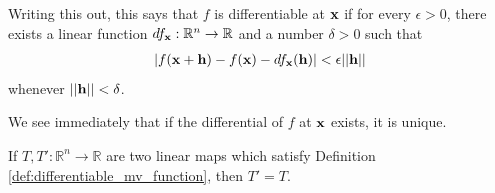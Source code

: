 \documentclass[12pt,letterpaper,reqno]{article}
\numberwithin{equation}{section}
\newcommand{\bh}{{\bf h}}
\newcommand{\R}{\ensuremath{\mathbb R}}
\newcommand{\bx}{{\bf x}}
\begin{document}
{\begin{defn}
Writing this out, this says that $f$ is differentiable at $\bx$ if for every $\epsilon>0$, there exists a linear function $df_\bx:\R^n \to \R$ and a number $\delta>0$ such that 
\begin{align*}
	|f(\bx+\bh)-f(\bx)-df_\bx(\bh)|<\epsilon ||\bh||
\end{align*}
whenever $||\bh||<\delta$.
\end{defn}
We see immediately that if the differential of $f$ at $\bx$ exists, it is unique.

\begin{prop}\label{prop:uniqueness_of_the_differential}
	If $T,T':\R^n \to \R$ are two linear maps which satisfy Definition \ref{def:differentiable_mv_function}, then $T'=T$.
\end{prop}

}
\end{document}

